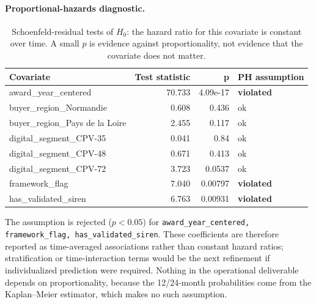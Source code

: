 \documentclass[11pt,a4paper]{article}
\newcommand{\code}[1]{\texttt{#1}}
\begin{document}
\paragraph{Proportional-hazards diagnostic.}
\begin{table}[H]
\centering
\small
\begin{tabularx}{\textwidth}{lrrl}
\toprule
Covariate & Test statistic & p & PH assumption \\
\midrule
award\_year\_centered & 70.733 & 4.09e-17 & \textbf{violated} \\
buyer\_region\_Normandie & 0.608 & 0.436 & ok \\
buyer\_region\_Pays de la Loire & 2.455 & 0.117 & ok \\
digital\_segment\_CPV-35 & 0.041 & 0.84 & ok \\
digital\_segment\_CPV-48 & 0.671 & 0.413 & ok \\
digital\_segment\_CPV-72 & 3.723 & 0.0537 & ok \\
framework\_flag & 7.040 & 0.00797 & \textbf{violated} \\
has\_validated\_siren & 6.763 & 0.00931 & \textbf{violated} \\
\bottomrule
\end{tabularx}
\caption{Schoenfeld-residual tests of \(H_0\): the hazard ratio for this
covariate is constant over time. A small \(p\) is evidence against
proportionality, not evidence that the covariate does not matter.}
\end{table}
The assumption is rejected (\(p<0.05\)) for
\code{award\_year\_centered, framework\_flag, has\_validated\_siren}. These coefficients are
therefore reported as time-averaged associations rather than constant hazard
ratios; stratification or time-interaction terms would be the next refinement
if individualized prediction were required. Nothing in the operational
deliverable depends on proportionality, because the 12/24-month probabilities
come from the Kaplan--Meier estimator, which makes no such assumption.
\end{document}
